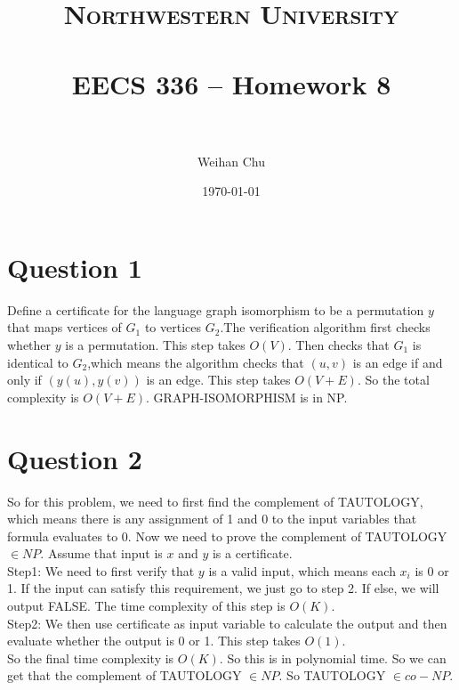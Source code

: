 \documentclass[paper=a4, fontsize=11pt]{scrartcl} %
\title{	
\normalfont \normalsize 
\textsc{Northwestern University} \\ [25pt] %
\horrule{0.5pt} \\[0.4cm] %
\huge EECS 336 -- Homework 8 \\ %
\horrule{2pt} \\[0.5cm] %
}
\author{Weihan Chu} %
\date{\normalsize\today} %
\numberwithin{equation}{section} %
\numberwithin{figure}{section} %
\numberwithin{table}{section} %
\begin{document}
\maketitle %


\section{\textbf{Question 1}}
Define a certificate for the language graph isomorphism to be a permutation $y$ that maps vertices of $G_1$ to vertices $G_2$.The verification algorithm first checks whether $y$ is a permutation. This step takes $O(V)$. Then checks that $G_1$ is identical to $G_2$,which means the algorithm checks that $(u,v)$ is an edge if and only if $(y(u),y(v))$ is an edge. This step takes $O(V+E)$. So the total complexity is $O(V+E)$. GRAPH-ISOMORPHISM is in NP.

\vspace{2cm}
\section{\textbf{Question 2}}
So for this problem, we need to first find the complement of TAUTOLOGY,  which means there is any assignment of 1 and 0 to the input variables that formula evaluates to 0. Now we need to prove the complement of TAUTOLOGY $\in {NP}$. Assume that input is $x$ and $y$ is a certificate.\\ 
Step1: We need to first verify that $y$ is a valid input, which means each $x_i$ is 0 or 1. If the input can satisfy this requirement, we just go to step 2. If else, we will output FALSE. The time complexity of this step is $O(K)$.\\
Step2: We then use certificate as input variable to calculate the output and then evaluate whether the output is 0 or 1. This step takes $O(1)$.\\
So the final time complexity is $O(K)$. So this is in polynomial time. So we can get that the complement of TAUTOLOGY $\in {NP}$. So TAUTOLOGY $\in {co-NP}$.

\vspace{2cm}
\end{document}
